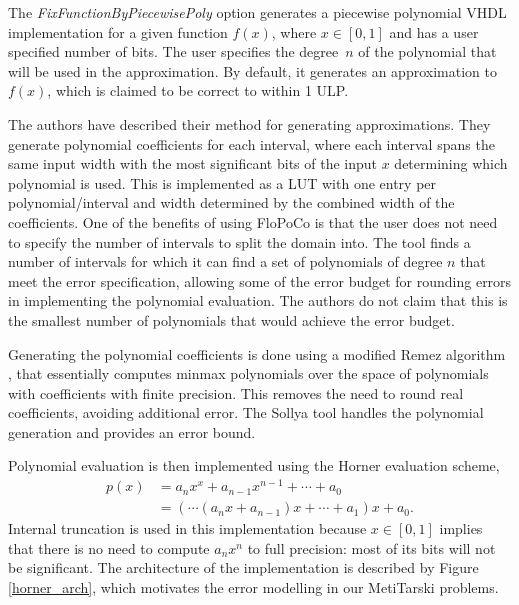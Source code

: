 \documentclass{fac}
\begin{document}
The \textit{FixFunctionByPiecewisePoly} option generates a piecewise polynomial VHDL implementation for a given function $f(x)$, where $x\in [0,1]$ and has a user specified number of bits. The user specifies the degree~$n$ of the polynomial that will be used in the approximation. By default, it generates an approximation to $f(x)$, which is claimed to be correct to within 1 ULP. 

The authors \cite{DinJolPas2010-poly} have described their method for generating approximations.
They generate polynomial coefficients for each interval, where each interval spans the same input width with the most significant bits of the input $x$ determining which polynomial is used. This is implemented as a LUT with one entry per polynomial/interval and width determined by the combined width of the coefficients. One of the benefits of using FloPoCo is that the user does not need to specify the number of intervals to split the domain into. The tool finds a number of intervals for which it can find a set of polynomials of degree $n$ that meet the error specification, allowing some of the error budget for rounding errors in implementing the polynomial evaluation. The authors do not claim that this is the smallest number of polynomials that would achieve the error budget. 

Generating the polynomial coefficients is done using a modified Remez algorithm \cite{brisebarre2007efficient}, that essentially computes minmax polynomials over the space of polynomials with coefficients with finite precision. This removes the need to round real coefficients, avoiding additional error. The Sollya tool \cite{ChevillardJoldesLauter2010} handles the polynomial generation and provides an error bound. 

Polynomial evaluation is then implemented using the Horner evaluation scheme, 
\begin{align*}
    p(x) &= a_n x^x + a_{n-1}x^{n-1} + \cdots + a_0 \\
         &= (\cdots(a_n x + a_{n-1})x + \cdots + a_1)x + a_0.
\end{align*}
Internal truncation is used in this implementation because $x\in [0,1]$ implies that there is no need to compute $a_n x^n$ to full precision: most of its bits will not be significant. The architecture of the implementation is described by Figure \ref{horner_arch}, which motivates the error modelling in our MetiTarski problems.
\end{document}
